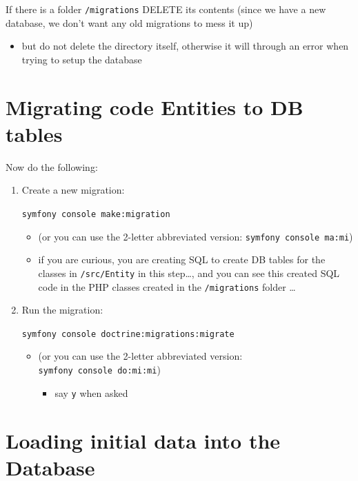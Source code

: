\documentclass[a4paperpaper,openright]{book}
\providecommand{\tightlist}{%
  \setlength{\itemsep}{0pt}\setlength{\parskip}{0pt}}
\begin{document}
If there is a folder \texttt{/migrations} DELETE its contents (since we
have a new database, we don't want any old migrations to mess it up)

\begin{itemize}
\tightlist
\item
  but do not delete the directory itself, otherwise it will through an
  error when trying to setup the database
\end{itemize}

\hypertarget{migrating-code-entities-to-db-tables}{%
\section{Migrating code Entities to DB
tables}\label{migrating-code-entities-to-db-tables}}

Now do the following:

\begin{enumerate}
\def\labelenumi{\arabic{enumi}.}
\item
  Create a new migration:

  \texttt{symfony\ console\ make:migration}

  \begin{itemize}
  \item
    (or you can use the 2-letter abbreviated version:
    \texttt{symfony\ console\ ma:mi})
  \item
    if you are curious, you are creating SQL to create DB tables for the
    classes in \texttt{/src/Entity} in this step\ldots{}, and you can
    see this created SQL code in the PHP classes created in the
    \texttt{/migrations} folder \ldots{}
  \end{itemize}
\item
  Run the migration:

  \texttt{symfony\ console\ doctrine:migrations:migrate}

  \begin{itemize}
  \item
    (or you can use the 2-letter abbreviated version:
    \texttt{symfony\ console\ do:mi:mi})

    \begin{itemize}
    \tightlist
    \item
      say \texttt{y} when asked
    \end{itemize}
  \end{itemize}
\end{enumerate}

\hypertarget{loading-initial-data-into-the-database}{%
\section{Loading initial data into the
Database}\label{loading-initial-data-into-the-database}}
\end{document}
